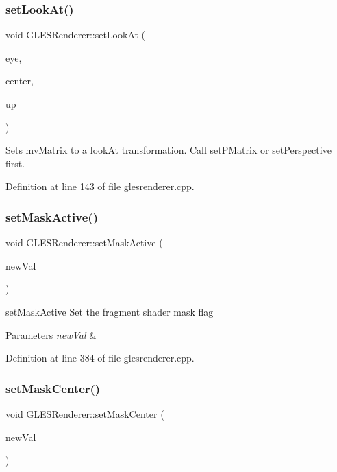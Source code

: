 \subsubsection{\texorpdfstring{setLookAt()}{setLookAt()}}
{\footnotesize\ttfamily void G\+L\+E\+S\+Renderer\+::set\+Look\+At (\begin{DoxyParamCaption}\item[{const Q\+Vector3D \&}]{eye,  }\item[{const Q\+Vector3D \&}]{center,  }\item[{const Q\+Vector3D \&}]{up }\end{DoxyParamCaption})}

Sets mv\+Matrix to a look\+At transformation. Call set\+P\+Matrix or set\+Perspective first. 

Definition at line 143 of file glesrenderer.\+cpp.

\mbox{\label{class_g_l_e_s_renderer_a957d299ae6eafc6604b5de598f525c6d}} 
\subsubsection{\texorpdfstring{setMaskActive()}{setMaskActive()}}
{\footnotesize\ttfamily void G\+L\+E\+S\+Renderer\+::set\+Mask\+Active (\begin{DoxyParamCaption}\item[{bool}]{new\+Val }\end{DoxyParamCaption})}



set\+Mask\+Active Set the fragment shader mask flag 


\begin{DoxyParams}{Parameters}
{\em new\+Val} & \\
\hline
\end{DoxyParams}


Definition at line 384 of file glesrenderer.\+cpp.

\mbox{\label{class_g_l_e_s_renderer_aa41f49d92c3514ce90a354cd2127d1c5}} 
\subsubsection{\texorpdfstring{setMaskCenter()}{setMaskCenter()}}
{\footnotesize\ttfamily void G\+L\+E\+S\+Renderer\+::set\+Mask\+Center (\begin{DoxyParamCaption}\item[{const Q\+Point \&}]{new\+Val }\end{DoxyParamCaption})}



